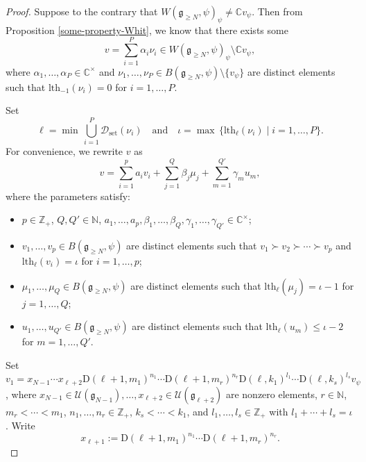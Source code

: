 \documentclass[10pt,a4paper]{amsart}
\newcommand{\C}{\mathbb{C}}
\newcommand{\N}{\mathbb N}
\newcommand{\U}{\mathcal{U}}
\newcommand{\Z}{\mathbb Z}
\newcommand{\fg}{\mathfrak g}
\newcommand{\rD}{\mathrm{D}}
\begin{document}
\begin{proof}
Suppose to the contrary that $W(\fg_{\geq N},\psi)_{\psi}\neq\C v_{\psi}$.
Then from Proposition \ref{some-property-Whit}, we know that
there exists some \[v=\sum_{i=1}^{P}\alpha_{i}\nu_{i}\in W(\fg_{\geq N},\psi)_{\psi}\setminus \C v_{\psi},\]
where $\alpha_{1},\dots,\alpha_{P}\in\C^{\times}$ and $\nu_{1},\dots,\nu_{P}\in B(\fg_{\geq N},\psi)\setminus\{v_{\psi}\}$
are distinct elements such that $\mathrm{lth}_{-1}(\nu_{i})=0$ for $i=1,\dots,P$.

Set \[\ell=\min\,\bigcup_{i=1}^{P}\mathcal{D}_{\mathrm{set}}(\nu_{i})\quad \text{and}\quad
\iota=\max\,\{\mathrm{lth}_{\ell}(\nu_{i})\mid i=1,\dots,P\}.\]
For convenience, we rewrite $v$ as
\[v=\sum_{i=1}^{p}a_{i}v_{i}+\sum_{j=1}^{Q}\beta_{j}\mu_{j}+\sum_{m=1}^{Q'}\gamma_{m}u_{m},\]
where the parameters satisfy:
\begin{itemize}
\item $p\in\Z_{+}$, $Q,Q'\in\N$, $a_{1},\dots,a_{p},\beta_{1},\dots,\beta_{Q},\gamma_{1},\dots,\gamma_{Q'}\in\C^{\times}$;
\item $v_{1},\dots,v_{p}\in B(\fg_{\geq N},\psi)$ are distinct elements such that $v_{1}\succ v_{2}\succ\cdots\succ v_{p}$
and $\mathrm{lth}_{\ell}(v_{i})=\iota$ for $i=1,\dots,p$;
\item $\mu_{1},\dots,\mu_{Q}\in B(\fg_{\geq N},\psi)$ are distinct elements
such that $\mathrm{lth}_{\ell}(\mu_{j})=\iota-1$ for $j=1,\dots,Q$;
\item $u_{1},\dots,u_{Q'}\in B(\fg_{\geq N},\psi)$ are distinct elements
such that $\mathrm{lth}_{\ell}(u_{m})\leq\iota-2$ for $m=1,\dots,Q'$.
\end{itemize}
Set $v_{1}=x_{N-1}\cdots x_{\ell+2}\rD(\ell+1,m_{1})^{n_{1}}\cdots\rD(\ell+1,m_{r})^{n_{r}}
\rD(\ell,k_{1})^{l_{1}}\cdots\rD(\ell,k_{s})^{l_{s}}v_{\psi}$,
where $x_{N-1}\in\U(\fg_{N-1}),\dots,x_{\ell+2}\in\U(\fg_{\ell+2})$ are nonzero elements, $r\in\N$,
$m_{r}<\cdots<m_{1}$, $n_{1},\dots,n_{r}\in\Z_{+}$, $k_{s}<\cdots<k_{1}$,
and $l_{1},\dots,l_{s}\in\Z_{+}$ with $l_{1}+\cdots+l_{s}=\iota$.
Write \[x_{\ell+1}:=\rD(\ell+1,m_{1})^{n_{1}}\cdots\rD(\ell+1,m_{r})^{n_{r}}.\]


\end{proof}
\end{document}

